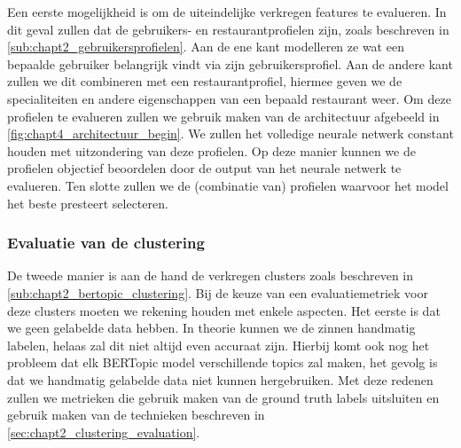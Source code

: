 Een eerste mogelijkheid is om de uiteindelijke verkregen features te evalueren. In dit geval zullen dat de gebruikers- en restaurantprofielen zijn, zoals beschreven in \autoref{sub:chapt2_gebruikersprofielen}. Aan de ene kant modelleren ze wat een bepaalde gebruiker belangrijk vindt via zijn gebruikersprofiel. Aan de andere kant zullen we dit combineren met een restaurantprofiel, hiermee geven we de specialiteiten en andere eigenschappen van een bepaald restaurant weer. Om deze profielen te evalueren zullen we gebruik maken van de architectuur afgebeeld in \autoref{fig:chapt4_architectuur_begin}. We zullen het volledige neurale netwerk constant houden met uitzondering van deze profielen. Op deze manier kunnen we de profielen objectief beoordelen door de output van het neurale netwerk te evalueren. Ten slotte zullen we de (combinatie van) profielen waarvoor het model het beste presteert selecteren.

\subsubsection{Evaluatie van de clustering}

De tweede manier is aan de hand de verkregen clusters zoals beschreven in \autoref{sub:chapt2_bertopic_clustering}. Bij de keuze van een evaluatiemetriek voor deze clusters moeten we rekening houden met enkele aspecten. Het eerste is dat we geen gelabelde data hebben. In theorie kunnen we de zinnen handmatig labelen, helaas zal dit niet altijd even accuraat zijn. Hierbij komt ook nog het probleem dat elk BERTopic model verschillende topics zal maken, het gevolg is dat we handmatig gelabelde data niet kunnen hergebruiken. Met deze redenen zullen we metrieken die gebruik maken van de ground truth labels uitsluiten en gebruik maken van de technieken beschreven in \autoref{sec:chapt2_clustering_evaluation}.





